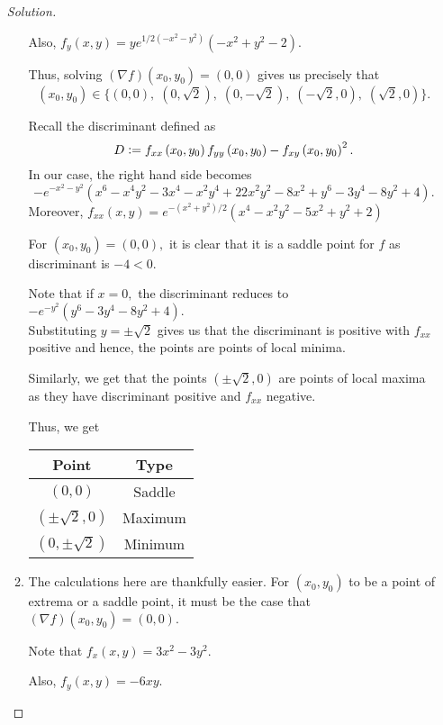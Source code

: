 \documentclass[12pt]{article}
\theoremstyle{definition}
\newenvironment{soln}{\begin{proof}[Solution]}{\end{proof}}
\begin{document}
\begin{itemize}
\begin{soln}
\begin{enumerate}
			Also, $f_y(x, y) =y e^{1 / 2\left(-x^{2}-y^{2}\right)}\left(-x^{2}+y^{2}-2\right).$

			Thus, solving $(\nabla f)(x_0, y_0) = (0, 0)$ gives us precisely that
			\begin{equation*} 
				(x_0, y_0) \in \{(0, 0),\;(0, \sqrt{2}),\;(0, -\sqrt{2}),\;(-\sqrt{2},0),\;(\sqrt{2}, 0)\}.
			\end{equation*}

			Recall the discriminant defined as
			\begin{equation*} 
				D \vcentcolon= f_{x x}\left(x_{0}, y_{0}\right) f_{y y}\left(x_{0}, y_{0}\right)-f_{x y}\left(x_{0}, y_{0}\right)^{2}.
			\end{equation*}
			In our case, the right hand side becomes
			\[-e^{-x^{2}-y^{2}}\left(x^{6}-x^{4} y^{2}-3 x^{4}-x^{2} y^{4}+22 x^{2} y^{2}-8 x^{2}+y^{6}-3 y^{4}-8 y^{2}+4\right).\]
			Moreover, $f_{xx}(x, y) = e^{-\left(x^{2}+y^{2}\right) / 2}(x^4 - x^2y^2 - 5x^2 + y^2 + 2)$ 

			For $(x_0, y_0) = (0, 0),$ it is clear that it is a saddle point for $f$ as discriminant is $-4 < 0.$

			Note that if $x = 0,$ the discriminant reduces to $-e^{-y^2}(y^6 - 3y^4 -8y^2 + 4).$ \\
			Substituting $y = \pm\sqrt{2}$ gives us that the discriminant is positive with $f_{xx}$ positive and hence, the points are points of local minima. 

			Similarly, we get that the points $(\pm\sqrt{2}, 0)$ are points of local maxima as they have discriminant positive and $f_{xx}$ negative. 

			Thus, we get
			\begin{center}
				
			\begin{tabular}{c|c}
				Point & Type\\
				\hline
				$(0, 0)$ & Saddle\\
				$(\pm\sqrt{2}, 0)$ & Maximum\\
				$(0, \pm\sqrt{2})$ & Minimum
			\end{tabular}
			\end{center}
		\item The calculations here are thankfully easier. For $(x_0, y_0)$ to be a point of extrema or a saddle point, it must be the case that $(\nabla f)(x_0, y_0) = (0, 0).$

		Note that $f_x(x, y) = 3x^2 - 3y^2.$

		Also, $f_y(x, y) = -6xy.$


\end{enumerate}
\end{soln}
\end{itemize}
\end{document}
